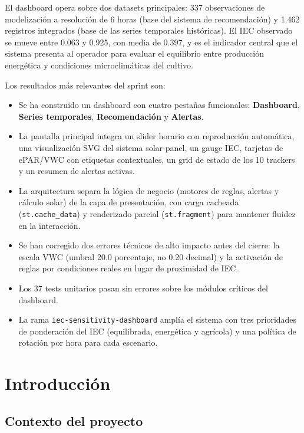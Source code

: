 \documentclass[11pt,a4paper]{article}
\begin{document}
El dashboard opera sobre dos datasets principales: 337 observaciones de modelización a
resolución de 6 horas (base del sistema de recomendación) y 1.462 registros integrados
(base de las series temporales históricas). El IEC observado se mueve entre 0.063 y 0.925,
con media de 0.397, y es el indicador central que el sistema presenta al operador para
evaluar el equilibrio entre producción energética y condiciones microclimáticas del cultivo.

Los resultados más relevantes del sprint son:

\begin{itemize}
  \item Se ha construido un dashboard con cuatro pestañas funcionales: \textbf{Dashboard},
    \textbf{Series temporales}, \textbf{Recomendación} y \textbf{Alertas}.
  \item La pantalla principal integra un slider horario con reproducción automática,
    una visualización SVG del sistema solar-panel, un gauge IEC, tarjetas de
    ePAR/VWC con etiquetas contextuales, un grid de estado de los 10 trackers y un
    resumen de alertas activas.
  \item La arquitectura separa la lógica de negocio (motores de reglas, alertas y cálculo
    solar) de la capa de presentación, con carga cacheada (\texttt{st.cache\_data}) y
    renderizado parcial (\texttt{st.fragment}) para mantener fluidez en la interacción.
  \item Se han corregido dos errores técnicos de alto impacto antes del cierre: la escala
    VWC (umbral 20.0 porcentaje, no 0.20 decimal) y la activación de reglas por condiciones
    reales en lugar de proximidad de IEC.
  \item Los 37 tests unitarios pasan sin errores sobre los módulos críticos del dashboard.
  \item La rama \texttt{iec-sensitivity-dashboard} amplía el sistema con tres prioridades
    de ponderación del IEC (equilibrada, energética y agrícola) y una política de rotación
    por hora para cada escenario.
\end{itemize}

\section{Introducción}

\subsection{Contexto del proyecto}
\end{document}

